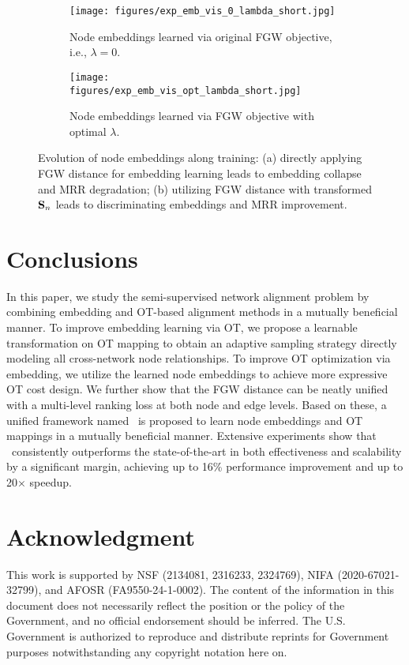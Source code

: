 \begin{figure}[t]
    \centering
    \begin{subfigure}[b]{0.5\textwidth}
        \centering
        \texttt{[image: figures/exp\_emb\_vis\_0\_lambda\_short.jpg]}
        \vspace{-10pt}
        \caption{Node embeddings learned via original FGW objective, i.e., $\lambda = 0$.}
        \label{subfig:exp_emb_vis_0}
    \end{subfigure}
    \hfill
    \begin{subfigure}[b]{0.5\textwidth}
        \centering
        \texttt{[image: figures/exp\_emb\_vis\_opt\_lambda\_short.jpg]}
        \vspace{-10pt}
        \caption{Node embeddings learned via FGW objective with optimal $\lambda$.}
        \label{subfig:exp_emb_vis_opt}
    \end{subfigure}
    \vspace{-15pt}
    \caption{Evolution of node embeddings along training: (a) directly applying FGW distance for embedding learning leads to embedding collapse and MRR degradation; (b) utilizing FGW distance with transformed $\mathbf{S}_n$ leads to discriminating embeddings and MRR improvement.}
    \label{fig:exp_emb_vis}
    \vspace{-15pt}
\end{figure}

\vspace{-5pt}
\section{Conclusions}\label{sec:con}
In this paper, we study the semi-supervised network alignment problem by combining embedding and OT-based alignment methods in a mutually beneficial manner. To improve embedding learning via OT, we propose a learnable transformation on OT mapping to obtain an adaptive sampling strategy directly modeling all cross-network node relationships. To improve OT optimization via embedding, we utilize the learned node embeddings to achieve more expressive OT cost design. We further show that the FGW distance can be neatly unified with a multi-level ranking loss at both node and edge levels. Based on these, a unified framework named \algname\ is proposed to learn node embeddings and OT mappings in a mutually beneficial manner. Extensive experiments show that \algname\ consistently outperforms the state-of-the-art in both effectiveness and scalability by a significant margin, achieving up to 16\% performance improvement and up to 20$\times$ speedup.


\section*{Acknowledgment}
This work is supported by NSF (2134081, 2316233, 2324769),
NIFA (2020-67021-32799),
and
AFOSR (FA9550-24-1-0002).
The content of the information in this document does not necessarily reflect the position or the policy of the Government, and no official endorsement should be inferred.  The U.S. Government is authorized to reproduce and distribute reprints for Government purposes notwithstanding any copyright notation here on.
